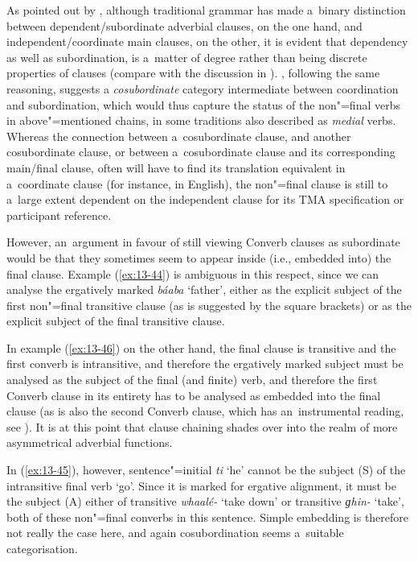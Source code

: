 As pointed out by \citet[327-8]{givon2001b}, although traditional grammar has made a~binary distinction between dependent/subordinate adverbial clauses, on the one hand, and independent/coordinate main clauses, on the other, it is evident that dependency as well as subordination, is a~matter of degree rather than being discrete properties of clauses (compare with the discussion in \citet[]{cristofaro2005}). \citet[20--27]{haspelmath1995}, following the same reasoning, suggests a \textit{cosubordinate} category intermediate between coordination and subordination, which would thus capture the status of the non"=final verbs in above"=mentioned chains, in some traditions also described as \textit{medial} verbs. Whereas the connection between a~cosubordinate clause, and another cosubordinate clause, or between a~cosubordinate clause and its corresponding main/final clause, often will have to find its translation equivalent in a~coordinate clause (for instance, in English), the non"=final clause is still to a~large extent dependent on the independent clause for its TMA specification or participant reference.



However, an~argument in favour of still viewing Converb clauses as subordinate would be that they sometimes seem to appear inside (i.e., embedded into) the final clause. Example (\ref{ex:13-44}) is ambiguous in this respect, since we can analyse the ergatively marked \textit{báaba} `father', either as the explicit subject of the first non"=final transitive clause (as is suggested by the square brackets) or as the explicit subject of the final transitive clause. 



In example (\ref{ex:13-46}) on the other hand, the final clause is transitive and the first converb is intransitive, and therefore the ergatively marked subject must be analysed as the subject of the final (and finite) verb, and therefore the first Converb clause in its entirety has to be analysed as embedded into the final clause (as is also the second Converb clause, which has an~instrumental reading, see ). It is at this point that clause chaining shades over into the realm of more asymmetrical adverbial functions. 



In (\ref{ex:13-45}), however, sentence"=initial \textit{ti} `he' cannot be the subject (S) of the intransitive final verb `go'. Since it is marked for ergative alignment, it must be the subject (A) either of transitive \textit{whaalé-} `take down' or transitive \textit{ɡhin-} `take', both of these non"=final converbs in this sentence. Simple embedding is therefore not really the case here, and again cosubordination seems a~suitable categorisation. 



